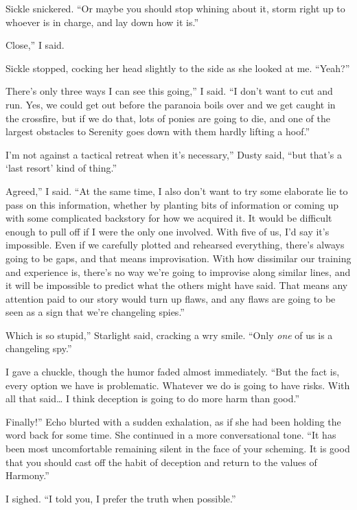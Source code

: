 Sickle snickered. “Or maybe you should stop whining about it, storm right up to whoever is in charge, and lay down how it is.”

\leavevmode{}Close,” I said.

Sickle stopped, cocking her head slightly to the side as she looked at me. “Yeah?”

\leavevmode{}There’s only three ways I can see this going,” I said. “I don’t want to cut and run. Yes, we could get out before the paranoia boils over and we get caught in the crossfire, but if we do that, lots of ponies are going to die, and one of the largest obstacles to Serenity goes down with them hardly lifting a hoof.”

\leavevmode{}I’m not against a tactical retreat when it’s necessary,” Dusty said, “but that’s a ‘last resort’ kind of thing.”

\leavevmode{}Agreed,” I said. “At the same time, I also don’t want to try some elaborate lie to pass on this information, whether by planting bits of information or coming up with some complicated backstory for how we acquired it. It would be difficult enough to pull off if I were the only one involved. With five of us, I’d say it’s impossible. Even if we carefully plotted and rehearsed everything, there’s always going to be gaps, and that means improvisation. With how dissimilar our training and experience is, there’s no way we’re going to improvise along similar lines, and it will be impossible to predict what the others might have said. That means any attention paid to our story would turn up flaws, and any flaws are going to be seen as a sign that we’re changeling spies.”

\leavevmode{}Which is so stupid,” Starlight said, cracking a wry smile. “Only \textit{one} of us is a changeling spy.”

I gave a chuckle, though the humor faded almost immediately. “But the fact is, every option we have is problematic. Whatever we do is going to have risks. With all that said… I think deception is going to do more harm than good.”

\leavevmode{}Finally!” Echo blurted with a sudden exhalation, as if she had been holding the word back for some time. She continued in a more conversational tone. “It has been most uncomfortable remaining silent in the face of your scheming. It is good that you should cast off the habit of deception and return to the values of Harmony.”

I sighed. “I told you, I prefer the truth when possible.”

